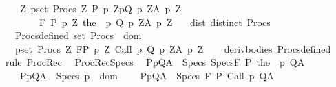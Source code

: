 \begin{isabellebody}
\ \ \ \ {\isasymforall}Z{\isachardot}\ {\isasymGamma}{\isacharcomma}{\isasymTheta}{\isasymunion}{\isacharparenleft}{\isasymUnion}p{\isasymin}set\ Procs{\isachardot}\ {\isasymUnion}Z{\isachardot}\ {\isacharbraceleft}{\isacharparenleft}P\ p\ Z{\isacharcomma}p{\isacharcomma}Q\ p\ Z{\isacharcomma}A\ p\ Z{\isacharparenright}{\isacharbraceright}{\isacharparenright}\isanewline
\ \ \ \ \ \ \ \ {\isasymturnstile}\isactrlbsub {\isacharslash}F\isactrlesub \ {\isacharparenleft}P\ p\ Z{\isacharparenright}\ {\isacharparenleft}the\ {\isacharparenleft}{\isasymGamma}\ p{\isacharparenright}{\isacharparenright}\ {\isacharparenleft}Q\ p\ Z{\isacharparenright}{\isacharcomma}{\isacharparenleft}A\ p\ Z{\isacharparenright}{\isachardoublequoteclose}\isanewline
\ \ \ dist{\isacharcolon}\ {\isachardoublequoteopen}distinct\ Procs{\isachardoublequoteclose}\isanewline
\ \ \ Procs{\isacharunderscore}defined{\isacharcolon}\ {\isachardoublequoteopen}set\ Procs\ {\isasymsubseteq}\ dom\ {\isasymGamma}{\isachardoublequoteclose}\isanewline
\ \ \ {\isachardoublequoteopen}{\isasymforall}p{\isasymin}set\ Procs{\isachardot}\ {\isasymforall}Z{\isachardot}\ {\isasymGamma}{\isacharcomma}{\isasymTheta}{\isasymturnstile}\isactrlbsub {\isacharslash}F\isactrlesub {\isacharparenleft}P\ p\ Z{\isacharparenright}\ Call\ p\ {\isacharparenleft}Q\ p\ Z{\isacharparenright}{\isacharcomma}{\isacharparenleft}A\ p\ Z{\isacharparenright}{\isachardoublequoteclose}\isanewline
%
\isadelimproof
\ \ %
\endisadelimproof
%
\isatagproof
{}\isamarkupfalse%
\ deriv{\isacharunderscore}bodies\ Procs{\isacharunderscore}defined\isanewline
\ \ \isamarkupfalse%
\ {\isacharparenleft}rule\ ProcRec{\isacharparenright}%
\endisatagproof
{\isafoldproof}%
%
\isadelimproof
\isanewline
%
\endisadelimproof
\isanewline
{}\isamarkupfalse%
\ \ ProcRecSpecs{\isacharcolon}\isanewline
\ \ {\isachardoublequoteopen}{\isasymlbrakk}{\isasymforall}{\isacharparenleft}P{\isacharcomma}p{\isacharcomma}Q{\isacharcomma}A{\isacharparenright}\ {\isasymin}\ Specs{\isachardot}\ {\isasymGamma}{\isacharcomma}{\isasymTheta}{\isasymunion}Specs{\isasymturnstile}\isactrlbsub {\isacharslash}F\isactrlesub \ P\ {\isacharparenleft}the\ {\isacharparenleft}{\isasymGamma}\ p{\isacharparenright}{\isacharparenright}\ Q{\isacharcomma}A{\isacharsemicolon}\isanewline
\ \ \ \ {\isasymforall}{\isacharparenleft}P{\isacharcomma}p{\isacharcomma}Q{\isacharcomma}A{\isacharparenright}\ {\isasymin}\ Specs{\isachardot}\ p\ {\isasymin}\ dom\ {\isasymGamma}{\isasymrbrakk}\isanewline
\ \ {\isasymLongrightarrow}\ {\isasymforall}{\isacharparenleft}P{\isacharcomma}p{\isacharcomma}Q{\isacharcomma}A{\isacharparenright}\ {\isasymin}\ Specs{\isachardot}\ {\isasymGamma}{\isacharcomma}{\isasymTheta}{\isasymturnstile}\isactrlbsub {\isacharslash}F\isactrlesub \ P\ {\isacharparenleft}Call\ p{\isacharparenright}\ Q{\isacharcomma}A{\isachardoublequoteclose}\isanewline

\end{isabellebody}
